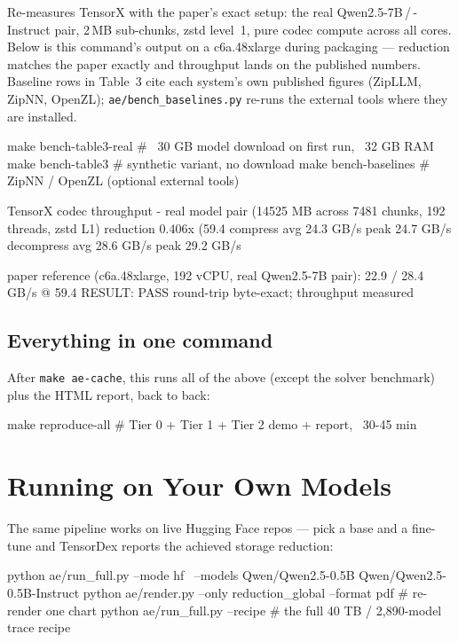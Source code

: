 \documentclass[11pt]{article}
\newcommand{\code}[1]{\texttt{#1}}
\begin{document}
Re-measures TensorX with the paper's exact setup: the real
Qwen2.5-7B\,/\,-Instruct pair, 2\,MB sub-chunks, zstd level~1, pure codec
compute across all cores. Below is this command's output on a c6a.48xlarge
during packaging --- reduction matches the paper exactly and throughput lands
on the published numbers. Baseline rows in Table~3 cite each system's own
published figures (ZipLLM, ZipNN, OpenZL); \code{ae/bench\_baselines.py}
re-runs the external tools where they are installed.

\begin{shell}
make bench-table3-real   # ~30 GB model download on first run, ~32 GB RAM
make bench-table3        # synthetic variant, no download
make bench-baselines     # ZipNN / OpenZL (optional external tools)
\end{shell}
\begin{term}
TensorX codec throughput - real model pair (14525 MB across 7481
chunks, 192 threads, zstd L1)
  reduction    0.406x (59.4%
  compress     avg   24.3 GB/s   peak   24.7 GB/s
  decompress   avg   28.6 GB/s   peak   29.2 GB/s

paper reference (c6a.48xlarge, 192 vCPU, real Qwen2.5-7B pair):
  22.9 / 28.4 GB/s @ 59.4%
RESULT: PASS  round-trip byte-exact; throughput measured
\end{term}

\subsection{Everything in one command}

After \code{make ae-cache}, this runs all of the above (except the solver
benchmark) plus the HTML report, back to back:

\begin{shell}
make reproduce-all       # Tier 0 + Tier 1 + Tier 2 demo + report, ~30-45 min
\end{shell}

\section{Running on Your Own Models}

The same pipeline works on live Hugging Face repos --- pick a base and a
fine-tune and TensorDex reports the achieved storage reduction:

\begin{shell}
python ae/run_full.py --mode hf \
    --models Qwen/Qwen2.5-0.5B Qwen/Qwen2.5-0.5B-Instruct
python ae/render.py --only reduction_global --format pdf   # re-render one chart
python ae/run_full.py --recipe   # the full 40 TB / 2,890-model trace recipe
\end{shell}
\end{document}
